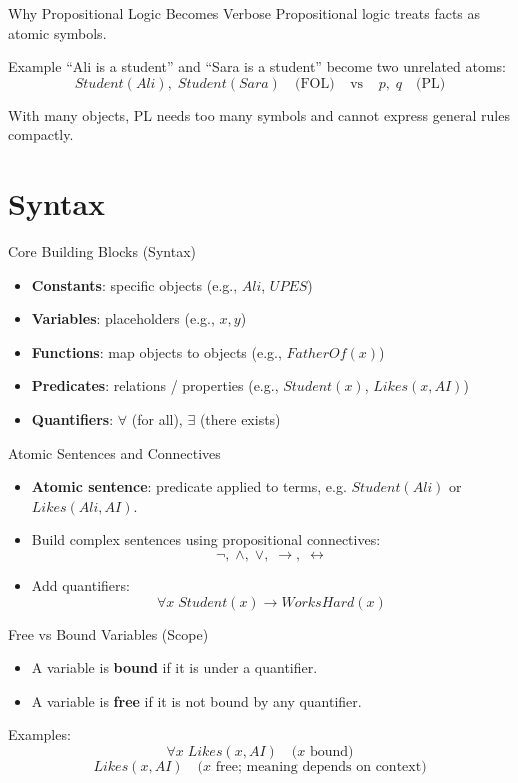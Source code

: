 \documentclass[aspectratio=169]{beamer}
\begin{document}
\begin{frame}{Why Propositional Logic Becomes Verbose}
  Propositional logic treats facts as atomic symbols.
  \vspace{0.4em}
  \begin{exampleblock}{Example}
    ``Ali is a student'' and ``Sara is a student'' become two unrelated atoms:
    \[
      Student(Ali),\; Student(Sara)\quad \text{(FOL)} \;\;\;\; \text{vs}\;\;\;\; p,\; q\quad \text{(PL)}
    \]
  \end{exampleblock}
  With many objects, PL needs too many symbols and cannot express general rules compactly.
\end{frame}

\section{Syntax}
\label{sec:syntax}

\begin{frame}{Core Building Blocks (Syntax)}
  \begin{itemize}[<+->]
    \item \textbf{Constants}: specific objects (e.g., $Ali$, $UPES$)
    \item \textbf{Variables}: placeholders (e.g., $x, y$)
    \item \textbf{Functions}: map objects to objects (e.g., $FatherOf(x)$)
    \item \textbf{Predicates}: relations / properties (e.g., $Student(x)$, $Likes(x, AI)$)
    \item \textbf{Quantifiers}: $\forall$ (for all), $\exists$ (there exists)
  \end{itemize}
\end{frame}

\begin{frame}{Atomic Sentences and Connectives}
  \begin{itemize}[<+->]
    \item \textbf{Atomic sentence}: predicate applied to terms, e.g. $Student(Ali)$ or $Likes(Ali, AI)$.
    \item Build complex sentences using propositional connectives:
    \[
      \lnot,\; \land,\; \lor,\; \rightarrow,\; \leftrightarrow
    \]
    \item Add quantifiers:
    \[
      \forall x\; Student(x) \rightarrow WorksHard(x)
    \]
  \end{itemize}
\end{frame}

\begin{frame}{Free vs Bound Variables (Scope)}
  \begin{itemize}[<+->]
    \item A variable is \textbf{bound} if it is under a quantifier.
    \item A variable is \textbf{free} if it is not bound by any quantifier.
  \end{itemize}
  \vspace{0.4em}
  Examples:
  \[
    \forall x\; Likes(x, AI) \quad \text{($x$ bound)}
  \]
  \[
    Likes(x, AI) \quad \text{($x$ free; meaning depends on context)}
  \]
\end{frame}
\end{document}
